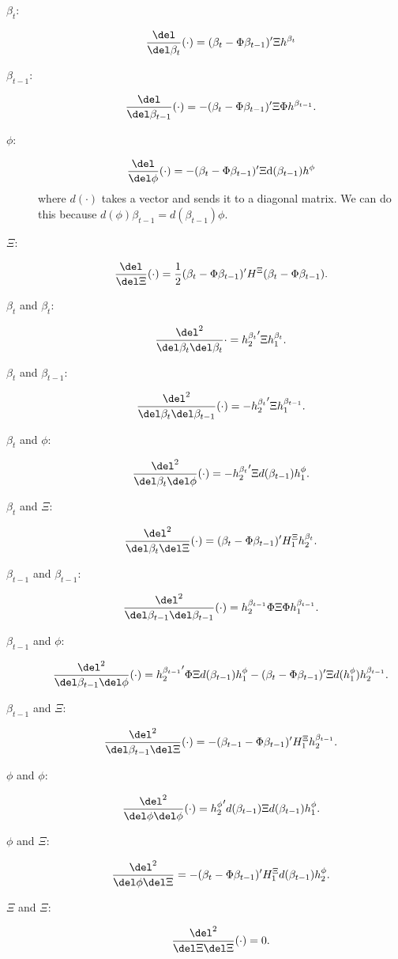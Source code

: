 \documentclass{article}
\begin{document}
\begin{description}
\item[$\beta_t$:] \hfill
\[
\frac{\del}{\del \beta_t} (\cdot) = (\beta_t - \Phi \beta_{t-1})' \Xi h^{\beta_t}
\]

\item[$\beta_{t-1}$:] \hfill
\[
\frac{\del}{\del \beta_{t-1}} (\cdot) = -(\beta_t - \Phi \beta_{t-1})' \Xi \Phi h^{\beta_{t-1}}.
\]

\item[$\phi$:] \hfill
\[
\frac{\del}{\del \phi} (\cdot) = - (\beta_t - \Phi \beta_{t-1})' \Xi
\text{d}(\beta_{t-1}) h^{\phi}
\]
where $d(\cdot)$ takes a vector and sends it to a diagonal matrix.  We can do
this because $d(\phi) \beta_{t-1} = d(\beta_{t-1}) \phi$.

\item[$\Xi$:] \hfill
\[
\frac{\del}{\del \Xi} (\cdot) = \frac{1}{2} (\beta_t - \Phi \beta_{t-1})' H^{\Xi} (\beta_t - \Phi \beta_{t-1}).
\]

\item[$\beta_t$ and $\beta_t$:] \hfill
\[
\frac{\del^2}{\del \beta_t \del \beta_t} \cdot = {h^{\beta_t}_2}' \Xi h^{\beta_t}_1.
\]

\item[$\beta_t$ and $\beta_{t-1}$:] \hfill
\[
\frac{\del^2}{\del \beta_t \del \beta_{t-1}} (\cdot) = - {h^{\beta_t}_2}' \Xi h^{\beta_{t-1}}_1.
\]

\item[$\beta_t$ and $\phi$:] \hfill
\[
\frac{\del^2}{\del \beta_t \del \phi} (\cdot) = - {h^{\beta_t}_2}' \Xi d(\beta_{t-1}) h^{\phi}_1.
\]

\item[$\beta_t$ and $\Xi$:] \hfill
\[
\frac{\del^2}{\del \beta_t \del \Xi} (\cdot) = (\beta_t - \Phi \beta_{t-1})'
H^{\Xi}_1 h^{\beta_t}_2.
\]

\item[$\beta_{t-1}$ and $\beta_{t-1}$:]
\[
\frac{\del^2}{\del \beta_{t-1} \del \beta_{t-1}} (\cdot) = h^{\beta_{t-1}}_2
\Phi \Xi \Phi h^{\beta_{t-1}}_1.
\]

\item[$\beta_{t-1}$ and $\phi$:]
\[
\frac{\del^2}{\del \beta_{t-1} \del \phi} (\cdot) = 
 {h^{\beta_{t-1}}_2}' \Phi \Xi d(\beta_{t-1}) h^{\phi}_1
- (\beta_t - \Phi \beta_{t-1})' \Xi d(h^{\phi}_1) h^{\beta_{t-1}}_2.
\]

\item[$\beta_{t-1}$ and $\Xi$:]
\[
\frac{\del^2}{\del \beta_{t-1} \del \Xi}(\cdot) = 
-(\beta_{t-1} - \Phi \beta_{t-1})' H^{\Xi}_1 h^{\beta_{t-1}}_2.
\]

\item[$\phi$ and $\phi$:]
\[
\frac{\del^2}{\del \phi \del \phi}(\cdot) = {h^{\phi}_2}' d(\beta_{t-1}) \Xi
d(\beta_{t-1}) h^{\phi}_1.
\]

\item[$\phi$ and $\Xi$:]
\[
\frac{\del^2}{\del \phi \del \Xi} = - (\beta_t - \Phi \beta_{t-1})' H^{\Xi}_1
d(\beta_{t-1}) h^{\phi}_2.
\]

\item[$\Xi$ and $\Xi$:]
\[
\frac{\del^2}{\del \Xi \del \Xi} (\cdot) = 0.
\]

\end{description}
\end{document}
